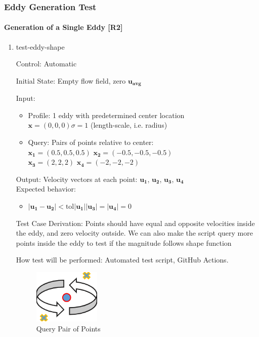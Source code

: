 \documentclass[12pt, titlepage]{article}
\begin{document}
\newpage
\subsubsection{Eddy Generation Test} \label{EddyGenTest}
\paragraph{Generation of a Single Eddy [R2]}

\begin{enumerate}

  \item{test-eddy-shape\\}

  Control: Automatic
            
  Initial State: Empty flow field, zero $\mathbf{u_{avg}}$
            
  Input:
  \begin{itemize}
    \item Profile: 1 eddy with predetermined center location\\
    $\mathbf{x}=(0,0,0)$\tab$\sigma=1$ (length-scale, i.e. radius) 
    \item Query: Pairs of points relative to center:\\
    $\mathbf{x_1}=(0.5,0.5,0.5)$ \tab$\mathbf{x_2}=(-0.5,-0.5,-0.5)$\\
    $\mathbf{x_3}=(2,2,2)$ \tab$\mathbf{x_4}=(-2,-2,-2)$
  \end{itemize}
  Output: Velocity vectors at each point: $\mathbf{u_1}$, $\mathbf{u_2}$, $\mathbf{u_3}$, $\mathbf{u_4}$\\
  Expected behavior:
  \begin{itemize}
    \item $|\mathbf{u_1} -\mathbf{u_2}| <\text{tol}|\mathbf{u_1}|$\tab $|\mathbf{u_3}| = |\mathbf{u_4}|=0$
  \end{itemize}

  Test Case Derivation: Points should have equal and opposite velocities inside the eddy, and zero velocity outside. We can also make the script query more points inside the eddy to test if the magnitude follows shape function
            
  How test will be performed: Automated test script, GitHub Actions.

  \begin{figure}[h!]
    \begin{center}
    \includegraphics[width=0.3\textwidth]{eddy-shape.png}
    \caption{Query Pair of Points}
    \label{Fig_EddyShape} 
    \end{center}
  \end{figure}


\end{enumerate}
\end{document}
